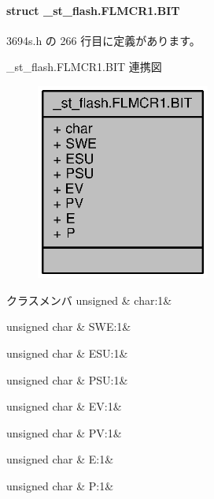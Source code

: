 \paragraph{struct \+\_\+st\+\_\+flash.\+F\+L\+M\+C\+R1.\+B\+I\+T}


 3694s.\+h の 266 行目に定義があります。



\+\_\+st\+\_\+flash.\+F\+L\+M\+C\+R1.\+B\+I\+T 連携図
\nopagebreak
\begin{figure}[H]
\begin{center}
\leavevmode
\includegraphics[width=162pt]{d5/d0f/struct__st__flash_8FLMCR1_8BIT__coll__graph}
\end{center}
\end{figure}
\begin{DoxyFields}{クラスメンバ}
unsigned\label{3694s_8h_aa87deb01c5f539e6bda34829c8ef2368}
&
char\+:1&
\\
\hline

unsigned char\label{3694s_8h_a572ef6761a1bd9204e45adf40fbf70ca}
&
S\+W\+E\+:1&
\\
\hline

unsigned char\label{3694s_8h_a654fd4aa564f81495ec2f2a4ad6b363b}
&
E\+S\+U\+:1&
\\
\hline

unsigned char\label{3694s_8h_a3f0a230dd4c7de35b6d1dc84a36b1a26}
&
P\+S\+U\+:1&
\\
\hline

unsigned char\label{3694s_8h_a834d41112f2943c357f660165b6eb6de}
&
E\+V\+:1&
\\
\hline

unsigned char\label{3694s_8h_aa565153df227b0510b1c789d5cdc39ec}
&
P\+V\+:1&
\\
\hline

unsigned char\label{3694s_8h_a3a3ea00cfc35332cedf6e5e9a32e94da}
&
E\+:1&
\\
\hline

unsigned char\label{3694s_8h_a44c29edb103a2872f519ad0c9a0fdaaa}
&
P\+:1&
\\
\hline

\end{DoxyFields}
\label{union__st__flash_8FLMCR2}
